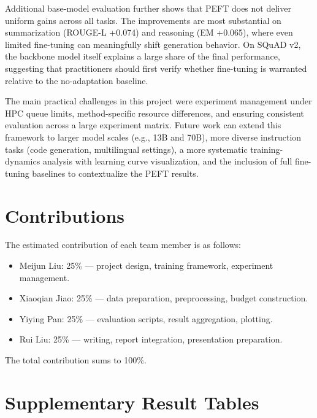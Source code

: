 \documentclass{article}
\begin{document}
Additional base-model evaluation further shows that PEFT does not deliver uniform gains across all tasks. The improvements are most substantial on summarization (ROUGE-L +0.074) and reasoning (EM +0.065), where even limited fine-tuning can meaningfully shift generation behavior. On SQuAD v2, the backbone model itself explains a large share of the final performance, suggesting that practitioners should first verify whether fine-tuning is warranted relative to the no-adaptation baseline.

The main practical challenges in this project were experiment management under HPC queue limits, method-specific resource differences, and ensuring consistent evaluation across a large experiment matrix. Future work can extend this framework to larger model scales (e.g., 13B and 70B), more diverse instruction tasks (code generation, multilingual settings), a more systematic training-dynamics analysis with learning curve visualization, and the inclusion of full fine-tuning baselines to contextualize the PEFT results.

\section{Contributions}

The estimated contribution of each team member is as follows:
\begin{itemize}
    \item Meijun Liu: 25\% --- project design, training framework, experiment management.
    \item Xiaoqian Jiao: 25\% --- data preparation, preprocessing, budget construction.
    \item Yiying Pan: 25\% --- evaluation scripts, result aggregation, plotting.
    \item Rui Liu: 25\% --- writing, report integration, presentation preparation.
\end{itemize}

The total contribution sums to 100\%.




\appendix

\section{Supplementary Result Tables}
\end{document}
